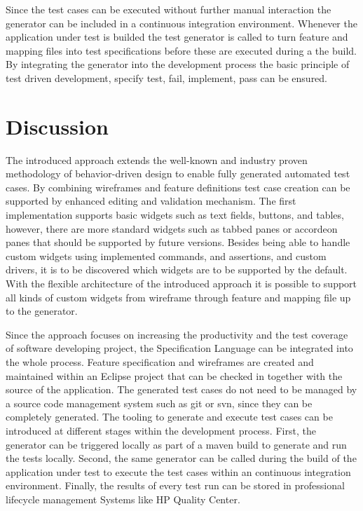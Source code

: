 \documentclass{sig-alternate-05-2015}
\begin{document}
Since the test cases can be executed without further manual interaction the generator can be included in a continuous integration environment.
Whenever the application under test is builded the test generator is called to turn feature and mapping files into test specifications before these are executed during a the build.
By integrating the generator into the development process the basic principle of test driven development, specify test, fail, implement, pass can be ensured.


\section{Discussion}\label{sec:Discussion}
The introduced approach extends the well-known and industry proven methodology of behavior-driven design to enable fully generated automated test cases.
By combining wireframes and feature definitions test case creation can be supported by enhanced editing and validation mechanism.
The first implementation supports basic widgets such as text fields, buttons, and tables, however, there are more standard widgets such as tabbed panes or accordeon panes that should be supported by future versions.
Besides being able to handle custom widgets using implemented commands, and assertions, and custom drivers, it is to be discovered which widgets are to be supported by the default.
With the flexible architecture of the introduced approach it is possible to support all kinds of custom widgets from wireframe through feature and mapping file up to the generator.

Since the approach focuses on increasing the productivity and the test coverage of software developing project, the Specification Language can be integrated into the whole process.
Feature specification and wireframes are created and maintained within an Eclipse project that can be checked in together with the source of the application.
The generated test cases do not need to be managed by a source code management system such as git or svn, since they can be completely generated.
The tooling to generate and execute test cases can be introduced at different stages within the development process. 
First, the generator can be triggered locally as part of a maven build to generate and run the tests locally.
Second, the same generator can be called during the build of the application under test to execute the test cases within an continuous integration environment.
Finally, the results of every test run can be stored in professional lifecycle management Systems like HP Quality Center.
\end{document}
